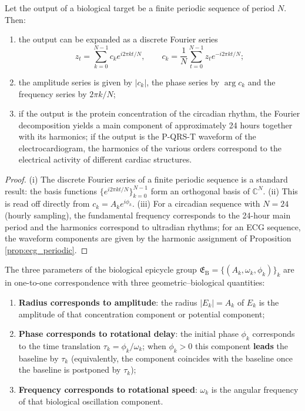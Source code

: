 \begin{theorem}\label{thm:bio_series_reconstruction}
Let the output of a biological target be a finite periodic sequence of period $N$. Then:
\begin{enumerate}[label=(\roman*)]
    \item the output can be expanded as a discrete Fourier series
    \[
    z_t=\sum_{k=0}^{N-1}c_k e^{i2\pi kt/N},\qquad
    c_k=\frac1N\sum_{t=0}^{N-1}z_t e^{-i2\pi kt/N};
    \]
    \item the amplitude series is given by $|c_k|$, the phase series by $\arg c_k$ and the frequency series by $2\pi k/N$;
    \item if the output is the protein concentration of the circadian rhythm, the Fourier decomposition yields a main component of approximately 24 hours together with its harmonics; if the output is the P-QRS-T waveform of the electrocardiogram, the harmonics of the various orders correspond to the electrical activity of different cardiac structures.
\end{enumerate}
\end{theorem}

\begin{proof}
(i) The discrete Fourier series of a finite periodic sequence is a standard result: the basis functions $\{e^{i2\pi kt/N}\}_{k=0}^{N-1}$ form an orthogonal basis of $\mathbb C^N$.
(ii) This is read off directly from $c_k=A_k e^{i\phi_k}$.
(iii) For a circadian sequence with $N=24$ (hourly sampling), the fundamental frequency corresponds to the 24-hour main period and the harmonics correspond to ultradian rhythms; for an ECG sequence, the waveform components are given by the harmonic assignment of Proposition \ref{prop:ecg_periodic}.
\end{proof}

\begin{proposition}\label{prop:bio_epicycle_correspondence}
The three parameters of the biological epicycle group $\mathfrak E_{\mathrm{B}}=\{(A_k,\omega_k,\phi_k)\}_{k}$ are in one-to-one correspondence with three geometric--biological quantities:
\begin{enumerate}[label=(\roman*)]
    \item \textbf{Radius corresponds to amplitude}: the radius $|E_k|=A_k$ of $E_k$ is the amplitude of that concentration component or potential component;
    \item \textbf{Phase corresponds to rotational delay}: the initial phase $\phi_k$ corresponds to the time translation $\tau_k=\phi_k/\omega_k$; when $\phi_k>0$ this component \textbf{leads} the baseline by $\tau_k$ (equivalently, the component coincides with the baseline once the baseline is postponed by $\tau_k$);
    \item \textbf{Frequency corresponds to rotational speed}: $\omega_k$ is the angular frequency of that biological oscillation component.
\end{enumerate}
\end{proposition}

